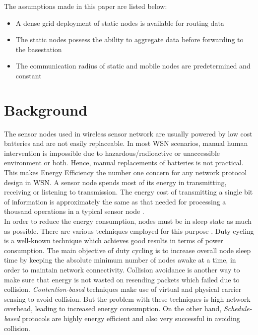 \documentclass[a4paper, conference, 10pt]{IEEEtran}
\begin{document}
The assumptions made in this paper are listed below:
\begin{itemize}
	\item A dense grid deployment of static nodes is available for routing data
	\item The static nodes possess the ability to aggregate data before forwarding to the basestation
	\item The communication radius of static and mobile nodes are predetermined and constant
\end{itemize}

\section{Background}
The sensor nodes used in wireless sensor network are usually powered by low cost batteries and are not easily replaceable. In most WSN scenarios, manual human intervention is impossible due to hazardous/radioactive or unaccessible environment or both. Hence, manual replacements of batteries is not practical. This makes Energy Efficiency the number one concern for any network protocol design in WSN. A sensor node spends most of its energy in transmitting, receiving or listening to transmission. The energy cost of transmitting a single bit of information is approximately the same as that needed for processing a thousand operations in a typical sensor node \cite{eeff_q}. \\

In order to reduce the energy consumption, nodes must be in sleep state as much as possible. There are various techniques employed for this purpose \cite{eeff_tech}. Duty cycling is a well-known technique which achieves good results in terms of power consumption. The main objective of duty cycling is to increase overall node sleep time by keeping the absolute minimum number of nodes awake at a time, in order to maintain network connectivity. Collision avoidance is another way to make sure that energy is not wasted on resending packets which failed due to collision. \emph{Contention-based} techniques make use of virtual and physical carrier sensing to avoid collision. But the problem with these techniques is high network overhead, leading to increased energy consumption. On the other hand, \emph{Schedule-based} protocols are highly energy efficient and also very successful in avoiding collision. \\
\end{document}

